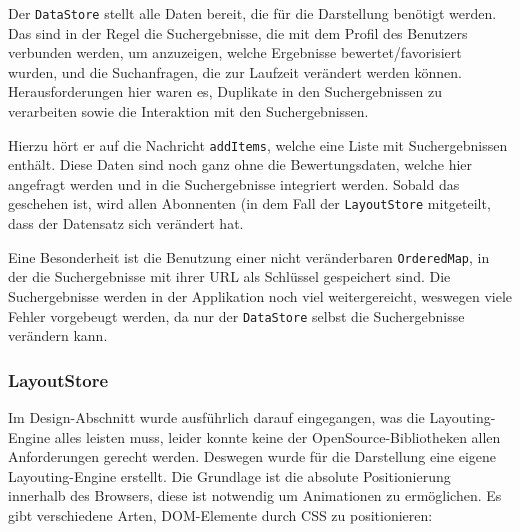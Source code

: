 \documentclass[12pt,twoside]{book}
\begin{document}
Der \texttt{DataStore} stellt alle Daten bereit, die für die Darstellung benötigt werden. Das sind in der Regel die Suchergebnisse, die mit dem Profil des Benutzers verbunden werden, um anzuzeigen, welche Ergebnisse bewertet/favorisiert wurden, und die Suchanfragen, die zur Laufzeit verändert werden können. Herausforderungen hier waren es, Duplikate in den Suchergebnissen zu verarbeiten sowie die Interaktion mit den Suchergebnissen.

Hierzu hört er auf die Nachricht \texttt{addItems}, welche eine Liste mit Suchergebnissen enthält. Diese Daten sind noch ganz ohne die Bewertungsdaten, welche hier angefragt werden und in die Suchergebnisse integriert werden. Sobald das geschehen ist, wird allen Abonnenten (in dem Fall der \texttt{LayoutStore} mitgeteilt, dass der Datensatz sich verändert hat.

Eine Besonderheit ist die Benutzung einer nicht veränderbaren \texttt{OrderedMap}, in der die Suchergebnisse mit ihrer URL als Schlüssel gespeichert sind. Die Suchergebnisse werden in der Applikation noch viel weitergereicht, weswegen viele Fehler vorgebeugt werden, da nur der \texttt{DataStore} selbst die Suchergebnisse verändern kann.

\subsubsection*{LayoutStore}

Im Design-Abschnitt wurde ausführlich darauf eingegangen, was die Layouting-Engine alles leisten muss, leider konnte keine der OpenSource-Bibliotheken allen Anforderungen gerecht werden. Deswegen wurde für die Darstellung eine eigene Layouting-Engine erstellt.
Die Grundlage ist die absolute Positionierung innerhalb des Browsers, diese ist notwendig um Animationen zu ermöglichen. Es gibt verschiedene Arten, DOM-Elemente durch CSS zu positionieren:
\end{document}
